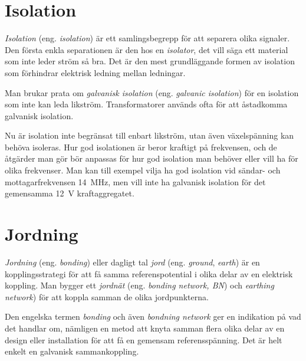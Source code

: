 \section{Isolation}

\emph{Isolation} (eng. \emph{isolation}) är ett samlingsbegrepp för att separera
olika signaler.
Den första enkla separationen är den hos en \emph{isolator}, det vill säga ett
material som inte leder ström så bra.
Det är den mest grundläggande formen av isolation som förhindrar elektrisk
ledning mellan ledningar.

Man brukar prata om \emph{galvanisk isolation} (eng. \emph{galvanic isolation})
för en isolation som inte kan leda likström.
Transformatorer används ofta för att åstadkomma galvanisk isolation.

Nu är isolation inte begränsat till enbart likström, utan även växelspänning
kan behöva isoleras.
Hur god isolationen är beror kraftigt på frekvensen, och de åtgärder man gör
bör anpassas för hur god isolation man behöver eller vill ha för olika
frekvenser.
Man kan till exempel vilja ha god isolation vid sändar- och mottagarfrekvensen
\qty{14}{\mega\hertz}, men vill inte ha galvanisk isolation för det gemensamma
\qty{12}{\volt} kraftaggregatet.

\section{Jordning}

\emph{Jordning} (eng. \emph{bonding}) eller dagligt tal \emph{jord} (eng.
\emph{ground}, \emph{earth}) är en kopplingsstrategi för att få samma
referenspotential i olika delar av en elektrisk koppling.
Man bygger ett \emph{jordnät} (eng. \emph{bonding network, BN})
\cite[kap 3.2.1]{K27-1991} och \emph{earthing network})
\cite[kap 3.1.3]{K27-1991} för att koppla samman de olika jordpunkterna.

Den engelska termen \emph{bonding} och även \emph{bondning network} ger en
indikation på vad det handlar om, nämligen en metod att knyta samman flera
olika delar av en design eller installation för att få en gemensam
referensspänning.
Det är helt enkelt en galvanisk sammankoppling.


